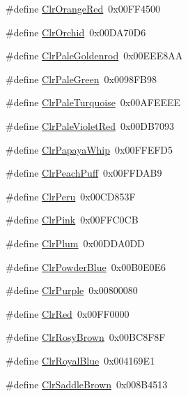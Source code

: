 \begin{DoxyCompactItemize}
\#define \hyperlink{group__primitives__api_gaf5c483e04d7c2b048e31cca37ba60f94}{Clr\+Orange\+Red}~0x00\+F\+F4500
\item 
\#define \hyperlink{group__primitives__api_gab7a1b53c8f7a08d276e125517ce08c16}{Clr\+Orchid}~0x00\+D\+A70\+D6
\item 
\#define \hyperlink{group__primitives__api_gab22fec35f3fe2ddee756ee95365d6d1d}{Clr\+Pale\+Goldenrod}~0x00\+E\+E\+E8\+A\+A
\item 
\#define \hyperlink{group__primitives__api_ga288c48e2e57a4e3b1fee2fee25950462}{Clr\+Pale\+Green}~0x0098\+F\+B98
\item 
\#define \hyperlink{group__primitives__api_ga630455640a877b52a9360c9a4b94f5f2}{Clr\+Pale\+Turquoise}~0x00\+A\+F\+E\+E\+E\+E
\item 
\#define \hyperlink{group__primitives__api_ga252e84c0e89be1e4eec5c0f9a86f9f2a}{Clr\+Pale\+Violet\+Red}~0x00\+D\+B7093
\item 
\#define \hyperlink{group__primitives__api_gadf1ee5680e11cb9c7664f695f80852a7}{Clr\+Papaya\+Whip}~0x00\+F\+F\+E\+F\+D5
\item 
\#define \hyperlink{group__primitives__api_ga8acbfe9cf3a567d8484acdd8fa2a6541}{Clr\+Peach\+Puff}~0x00\+F\+F\+D\+A\+B9
\item 
\#define \hyperlink{group__primitives__api_gaa3db700c8d2b937507d80530803193ec}{Clr\+Peru}~0x00\+C\+D853\+F
\item 
\#define \hyperlink{group__primitives__api_gab4bc177cfdf18404f9cc7dfa3f323b88}{Clr\+Pink}~0x00\+F\+F\+C0\+C\+B
\item 
\#define \hyperlink{group__primitives__api_ga52473d600f1e0017d63dd1a0164b0b83}{Clr\+Plum}~0x00\+D\+D\+A0\+D\+D
\item 
\#define \hyperlink{group__primitives__api_ga894638e5d230217c797d8efc10a871bf}{Clr\+Powder\+Blue}~0x00\+B0\+E0\+E6
\item 
\#define \hyperlink{group__primitives__api_ga2a91845150e2dd8f4dc5813ee50aedbb}{Clr\+Purple}~0x00800080
\item 
\#define \hyperlink{group__primitives__api_ga33b5ecf7d59bf3694af3531923987e3b}{Clr\+Red}~0x00\+F\+F0000
\item 
\#define \hyperlink{group__primitives__api_ga30a6e343db44518ffa44e56a55d7d5d4}{Clr\+Rosy\+Brown}~0x00\+B\+C8\+F8\+F
\item 
\#define \hyperlink{group__primitives__api_ga9c20d434653a8096671f0ed5a125370c}{Clr\+Royal\+Blue}~0x004169\+E1
\item 
\#define \hyperlink{group__primitives__api_gaf0f047403a2540922813060dff4b7fc0}{Clr\+Saddle\+Brown}~0x008\+B4513

\end{DoxyCompactItemize}
